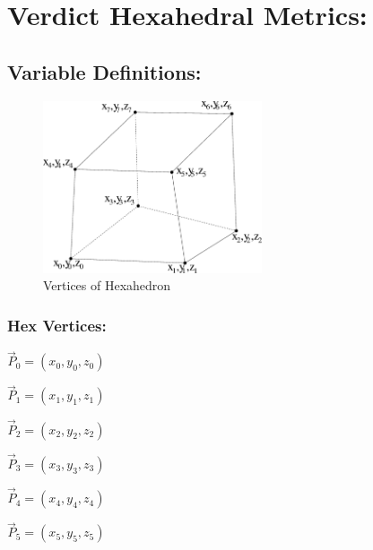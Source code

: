 \documentclass[12pt]{article}
\begin{document}
\section*{Verdict Hexahedral Metrics:}

\subsection*{Variable Definitions:}

\begin{figure}[htb]
  \begin{center}
    \includegraphics[height=2.0in]{hex.eps}
    \caption{Vertices of Hexahedron}
    \label{fig:blank}
  \end{center}
\end{figure}

\subsubsection*{Hex Vertices:}
\begin{center}
$\vec P_0 = (x_0, y_0, z_0)$ 
\end{center}

\begin{center}
$\vec P_1 = (x_1, y_1, z_1)$ 
\end{center}

\begin{center}
$\vec P_2 = (x_2, y_2, z_2)$
\end{center}

\begin{center}
$\vec P_3 = (x_3, y_3, z_3)$ 
\end{center}

\begin{center}
$\vec P_4 = (x_4, y_4, z_4)$ 
\end{center}

\begin{center}
$\vec P_5 = (x_5, y_5, z_5)$
\end{center}
\end{document}
